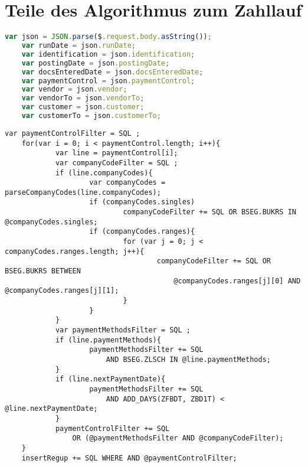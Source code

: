 \clearpage
\section{Teile des Algorithmus zum Zahllauf}

\begin{lstlisting}[caption={Ermittlung der Nutzereingaben aus der JSON-Anfrage}, label={lst:jsoninput}, language=JavaScript, basicstyle=\ttfamily\scriptsize]
    var json = JSON.parse($.request.body.asString());
    var runDate = json.runDate;
    var identification = json.identification;
    var postingDate = json.postingDate;
    var docsEnteredDate = json.docsEnteredDate;
    var paymentControl = json.paymentControl;
    var vendor = json.vendor;
    var vendorTo = json.vendorTo;
    var customer = json.customer;
    var customerTo = json.customerTo;
\end{lstlisting}

\begin{lstlisting}[caption={Verarbeitung der Filter in Tabellenform}, label={lst:paymentcontrol}, language=JavaScriptSQL, basicstyle=\ttfamily\scriptsize]
	var paymentControlFilter = SQL ;
	for(var i = 0; i < paymentControl.length; i++){
			var line = paymentControl[i];
			var companyCodeFilter = SQL ;
			if (line.companyCodes){
					var companyCodes = parseCompanyCodes(line.companyCodes);
					if (companyCodes.singles)
							companyCodeFilter += SQL OR BSEG.BUKRS IN @companyCodes.singles;
					if (companyCodes.ranges){
							for (var j = 0; j < companyCodes.ranges.length; j++){
									companyCodeFilter += SQL OR BSEG.BUKRS BETWEEN 
										@companyCodes.ranges[j][0] AND @companyCodes.ranges[j][1];
							}
					}
			}
			var paymentMethodsFilter = SQL ;
			if (line.paymentMethods){
					paymentMethodsFilter += SQL
						AND BSEG.ZLSCH IN @line.paymentMethods;
			}
			if (line.nextPaymentDate){
					paymentMethodsFilter += SQL
						AND ADD_DAYS(ZFBDT, ZBD1T) < @line.nextPaymentDate;
			}
			paymentControlFilter += SQL
				OR (@paymentMethodsFilter AND @companyCodeFilter);
	}
	insertRegup += SQL WHERE AND @paymentControlFilter;
\end{lstlisting}

